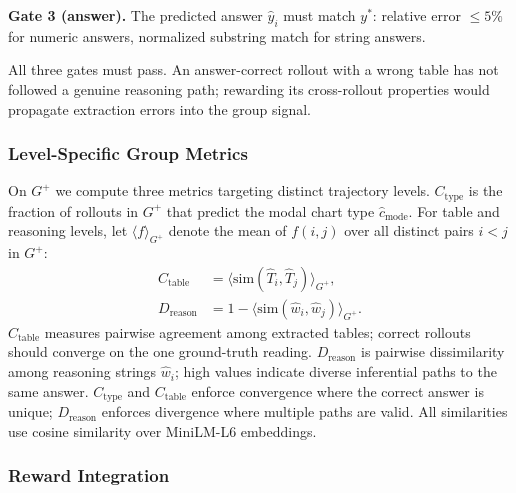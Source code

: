 \documentclass[11pt]{article}
\begin{document}
\textbf{Gate 3 (answer).} The predicted answer $\hat{y}_i$ must match
$y^*$: relative error ${\le}5\%$ for numeric answers, normalized
substring match for string answers.

All three gates must pass. An answer-correct rollout with a wrong table
has not followed a genuine reasoning path; rewarding its cross-rollout
properties would propagate extraction errors into the group signal.

\subsubsection{Level-Specific Group Metrics}
\label{sec:metrics_hcpc}

On $G^+$ we compute three metrics targeting distinct trajectory levels.
$C_{\text{type}}$ is the fraction of rollouts in $G^+$ that predict
the modal chart type $\hat{c}_{\text{mode}}$. For table and reasoning
levels, let $\langle f \rangle_{G^+}$ denote the mean of $f(i,j)$ over
all distinct pairs $i < j$ in $G^+$:
\begin{align*}
  C_{\text{table}}  &= \bigl\langle \mathrm{sim}(\hat{T}_i,\hat{T}_j)
                       \bigr\rangle_{G^+}, \\[2pt]
  D_{\text{reason}} &= 1 - \bigl\langle \mathrm{sim}(\hat{w}_i,\hat{w}_j)
                       \bigr\rangle_{G^+}.
\end{align*}
$C_{\text{table}}$ measures pairwise agreement among extracted tables;
correct rollouts should converge on the one ground-truth reading.
$D_{\text{reason}}$ is pairwise dissimilarity among reasoning strings
$\hat{w}_i$; high values indicate diverse inferential paths to the
same answer. $C_{\text{type}}$ and $C_{\text{table}}$ enforce
convergence where the correct answer is unique; $D_{\text{reason}}$
enforces divergence where multiple paths are valid.
All similarities use cosine similarity over MiniLM-L6 embeddings.

\subsubsection{Reward Integration}
\label{sec:bonus}
\end{document}
